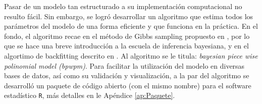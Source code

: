 \documentclass[../Main/Main.tex]{subfiles}
\begin{document}
Pasar de un modelo tan estructurado a su implementación computacional no resulto fácil. Sin embargo, se logró desarrollar un algoritmo que estima todos los parámetros del modelo de una forma eficiente y que funciona en la práctica. En el fondo, el algoritmo recae en el método de Gibbs sampling propuesto en \citet{albert1993bayesian}, por lo que se hace una breve introducción a la escuela de inferencia bayesiana, y en el algortimo de backfitting descrito en \citet{hastie1986generalized}. Al algoritmo se le titula: \textit{bayesian piece wise polinomial model (bpwpm)}. Para facilitar la utilización del modelo en diversas bases de datos, así como  su validación y visualización, a la par del algoritmo se desarrolló un paquete de código abierto (con el mismo nombre) para el software estadístico \verb|R|, más detalles en le Apéndice \ref{ap:Paquete}.
\end{document}
